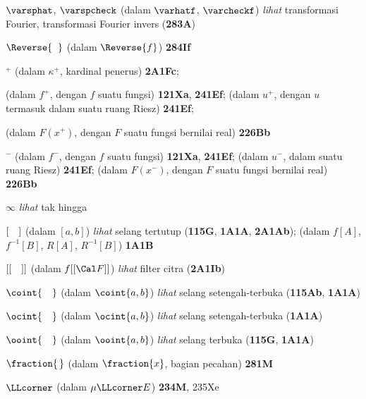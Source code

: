 $\varsphat$, $\varspcheck$ (dalam $\varhatf$, $\varcheckf$) {\it lihat}
transformasi Fourier, transformasi Fourier invers ({\bf 283A})
















$\Reverse{\phantom{x}}$ (dalam $\Reverse{f}$) {\bf 284If}








$^+$
  (dalam $\kappa^+$, kardinal penerus) {\bf 2A1Fc}; 
  
  (dalam $f^+$, dengan $f$ suatu fungsi) {\bf 121Xa}, {\bf 241Ef}; 
  (dalam $u^+$, dengan $u$ termasuk dalam suatu ruang Riesz) {\bf 241Ef}; 
  
  (dalam $F(x^+)$, dengan $F$ suatu fungsi bernilai real) {\bf 226Bb}


$^-$ (dalam $f^-$, dengan $f$ suatu fungsi) {\bf 121Xa}, {\bf 241Ef};
  (dalam $u^-$, dalam suatu ruang Riesz) {\bf 241Ef};
  (dalam $F(x^-)$, dengan $F$ suatu fungsi bernilai real) {\bf 226Bb}
  






















$\infty$ {\it lihat} tak hingga





$[\hskip1em]$ (dalam $[a,b]$) {\it lihat} selang tertutup ({\bf 115G},
{\bf 1A1A}, {\bf 2A1Ab});
  (dalam $f[A]$, $f^{-1}[B]$, $R[A]$, $R^{-1}[B]$) {\bf 1A1B}

$[[\hskip1em]]$ (dalam $f[[\Cal F]]$) {\it lihat} filter citra
({\bf 2A1Ib})




$\coint{\hskip1em}$ (dalam $\coint{a,b}$) {\it lihat} selang setengah-terbuka
({\bf 115Ab}, {\bf 1A1A})

$\ocint{\hskip1em}$ (dalam $\ocint{a,b}$) {\it lihat} selang setengah-terbuka
({\bf 1A1A})

$\ooint{\hskip1em}$ (dalam $\ooint{a,b}$) {\it lihat} selang terbuka
({\bf 115G}, {\bf 1A1A})





$\fraction{\,}$ (dalam $\fraction{x}$, bagian pecahan) {\bf 281M}




$\LLcorner$ (dalam $\mu\LLcorner E$) {\bf 234M}, 235Xe








\frnewpage

